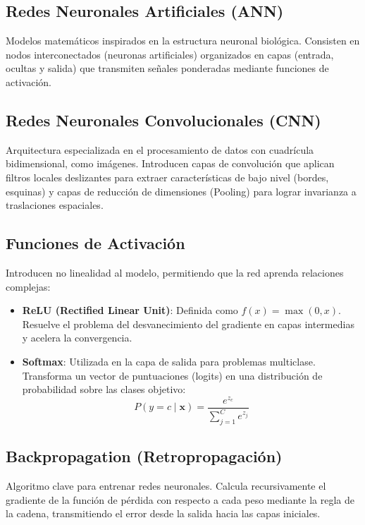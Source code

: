 \documentclass[conference,onecolumn]{IEEEtran}
\begin{document}
\subsection{Redes Neuronales Artificiales (ANN)}
Modelos matemáticos inspirados en la estructura neuronal biológica. Consisten en nodos interconectados (neuronas artificiales) organizados en capas (entrada, ocultas y salida) que transmiten señales ponderadas mediante funciones de activación.

\subsection{Redes Neuronales Convolucionales (CNN)}
Arquitectura especializada en el procesamiento de datos con cuadrícula bidimensional, como imágenes. Introducen capas de convolución que aplican filtros locales deslizantes para extraer características de bajo nivel (bordes, esquinas) y capas de reducción de dimensiones (Pooling) para lograr invarianza a traslaciones espaciales.

\subsection{Funciones de Activación}
Introducen no linealidad al modelo, permitiendo que la red aprenda relaciones complejas:
\begin{itemize}
    \item \textbf{ReLU (Rectified Linear Unit)}: Definida como $f(x) = \max(0, x)$. Resuelve el problema del desvanecimiento del gradiente en capas intermedias y acelera la convergencia.
    \item \textbf{Softmax}: Utilizada en la capa de salida para problemas multiclase. Transforma un vector de puntuaciones (logits) en una distribución de probabilidad sobre las clases objetivo:
    \begin{equation}
        P(y = c \mid \mathbf{x}) = \frac{e^{z_c}}{\sum_{j=1}^{C} e^{z_j}}
    \end{equation}
\end{itemize}

\subsection{Backpropagation (Retropropagación)}
Algoritmo clave para entrenar redes neuronales. Calcula recursivamente el gradiente de la función de pérdida con respecto a cada peso mediante la regla de la cadena, transmitiendo el error desde la salida hacia las capas iniciales.
\end{document}

